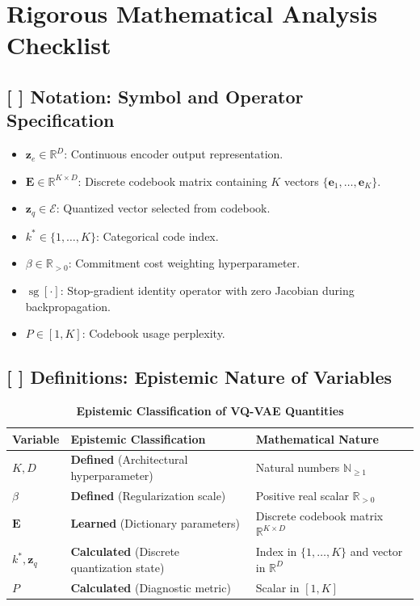 \documentclass[11pt,a4paper]{article}
\theoremstyle{definition}
\begin{document}
\section{Rigorous Mathematical Analysis Checklist}

\subsection{[ ] Notation: Symbol and Operator Specification}
\begin{itemize}
    \item $\mathbf{z}_e \in \mathbb{R}^D$: Continuous encoder output representation.
    \item $\mathbf{E} \in \mathbb{R}^{K \times D}$: Discrete codebook matrix containing $K$ vectors $\{\mathbf{e}_1, \dots, \mathbf{e}_K\}$.
    \item $\mathbf{z}_q \in \mathcal{E}$: Quantized vector selected from codebook.
    \item $k^* \in \{1, \dots, K\}$: Categorical code index.
    \item $\beta \in \mathbb{R}_{> 0}$: Commitment cost weighting hyperparameter.
    \item $\operatorname{sg}[\cdot]$: Stop-gradient identity operator with zero Jacobian during backpropagation.
    \item $P \in [1, K]$: Codebook usage perplexity.
\end{itemize}

\subsection{[ ] Definitions: Epistemic Nature of Variables}
\begin{table}[h]
\centering
\caption{\textbf{Epistemic Classification of VQ-VAE Quantities}}
\begin{tabular}{lll}
\toprule
\textbf{Variable} & \textbf{Epistemic Classification} & \textbf{Mathematical Nature} \\
\midrule
$K, D$ & \textbf{Defined} (Architectural hyperparameter) & Natural numbers $\mathbb{N}_{\ge 1}$ \\
$\beta$ & \textbf{Defined} (Regularization scale) & Positive real scalar $\mathbb{R}_{> 0}$ \\
$\mathbf{E}$ & \textbf{Learned} (Dictionary parameters) & Discrete codebook matrix $\mathbb{R}^{K \times D}$ \\
$k^*, \mathbf{z}_q$ & \textbf{Calculated} (Discrete quantization state) & Index in $\{1, \dots, K\}$ and vector in $\mathbb{R}^D$ \\
$P$ & \textbf{Calculated} (Diagnostic metric) & Scalar in $[1, K]$ \\
\bottomrule
\end{tabular}
\end{table}
\end{document}
